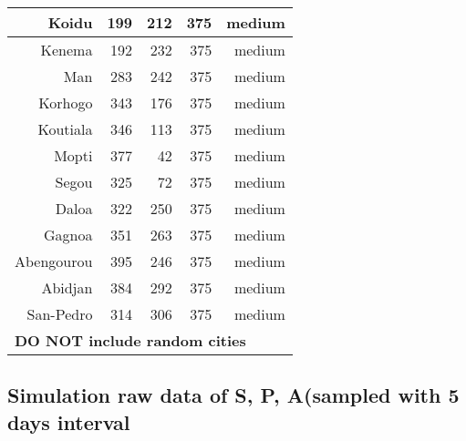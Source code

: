 {\begin{appendices}
\begin{longtable}{|r|r|r|r|r|}
     Koidu &        199 &        212 &        375 &     medium \\
\hline
    Kenema &        192 &        232 &        375 &     medium \\
\hline
       Man &        283 &        242 &        375 &     medium \\
\hline
   Korhogo &        343 &        176 &        375 &     medium \\
\hline
  Koutiala &        346 &        113 &        375 &     medium \\
\hline
     Mopti &        377 &         42 &        375 &     medium \\
\hline
     Segou &        325 &         72 &        375 &     medium \\
\hline
     Daloa &        322 &        250 &        375 &     medium \\
\hline
    Gagnoa &        351 &        263 &        375 &     medium \\
\hline
Abengourou &        395 &        246 &        375 &     medium \\
\hline
   Abidjan &        384 &        292 &        375 &     medium \\
\hline
 San-Pedro &        314 &        306 &        375 &     medium \\
\hline
    \multicolumn{ 5}{|l|}{{\bf *DO NOT include random cities}} \\
\hline
\end{longtable}

\subsection{Simulation raw data of S, P, A(sampled with 5 days interval}


\end{appendices}}
